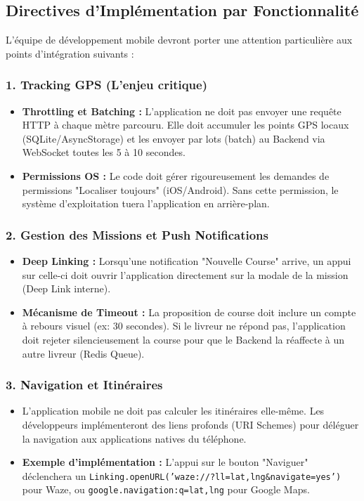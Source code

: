 \subsection{Directives d'Implémentation par Fonctionnalité}

L'équipe de développement mobile devront porter une attention particulière aux points d'intégration suivants :

\subsubsection{1. Tracking GPS (L'enjeu critique)}
\begin{itemize}
    \item \textbf{Throttling et Batching :} L'application ne doit pas envoyer une requête HTTP à chaque mètre parcouru. Elle doit accumuler les points GPS locaux (SQLite/AsyncStorage) et les envoyer par lots (batch) au Backend via WebSocket toutes les 5 à 10 secondes.
    \item \textbf{Permissions OS :} Le code doit gérer rigoureusement les demandes de permissions "Localiser toujours" (iOS/Android). Sans cette permission, le système d'exploitation tuera l'application en arrière-plan.
\end{itemize}

\subsubsection{2. Gestion des Missions et Push Notifications}
\begin{itemize}
    \item \textbf{Deep Linking :} Lorsqu'une notification "Nouvelle Course" arrive, un appui sur celle-ci doit ouvrir l'application directement sur la modale de la mission (Deep Link interne).
    \item \textbf{Mécanisme de Timeout :} La proposition de course doit inclure un compte à rebours visuel (ex: 30 secondes). Si le livreur ne répond pas, l'application doit rejeter silencieusement la course pour que le Backend la réaffecte à un autre livreur (Redis Queue).
\end{itemize}

\subsubsection{3. Navigation et Itinéraires}
\begin{itemize}
    \item L'application mobile ne doit pas calculer les itinéraires elle-même. Les développeurs implémenteront des liens profonds (URI Schemes) pour déléguer la navigation aux applications natives du téléphone.
    \item \textbf{Exemple d'implémentation :} L'appui sur le bouton "Naviguer" déclenchera un \texttt{Linking.openURL('waze://?ll=lat,lng\&navigate=yes')} pour Waze, ou \texttt{google.navigation:q=lat,lng} pour Google Maps.
\end{itemize}

